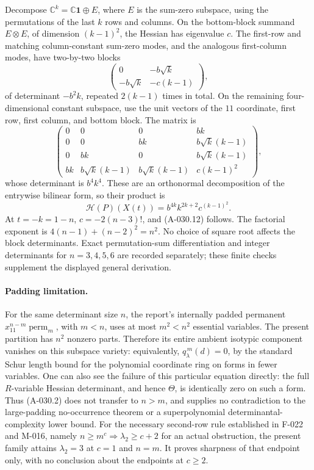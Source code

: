 Decompose \(\mathbb C^k=\mathbb C\mathbf1\oplus E\), where
\(E\) is the sum-zero subspace, using the permutations of the
last \(k\) rows and columns. On the bottom-block summand
\(E\otimes E\), of dimension \((k-1)^2\), the Hessian has
eigenvalue \(c\). The first-row and matching column-constant
sum-zero modes, and the analogous first-column modes, have
two-by-two blocks
\[
 \begin{pmatrix}0&-b\sqrt{k}\\-b\sqrt{k}&-c(k-1)\end{pmatrix},
\]
of determinant \(-b^2k\), repeated \(2(k-1)\) times in total.
On the remaining four-dimensional constant subspace, use the
unit vectors of the \(11\) coordinate, first row, first column,
and bottom block. The matrix is
\[
 \begin{pmatrix}
 0&0&0&bk\\
 0&0&bk&b\sqrt{k}(k-1)\\
 0&bk&0&b\sqrt{k}(k-1)\\
 bk&b\sqrt{k}(k-1)&b\sqrt{k}(k-1)&c(k-1)^2
 \end{pmatrix},
\]
whose determinant is \(b^4k^4\). These are an orthonormal
decomposition of the entrywise bilinear form, so their product is
\[
          \mathcal H(P)(X(t))
               =b^{4k}k^{2k+2}c^{(k-1)^2}.                     \tag{A-030.13}
\]
At \(t=-k=1-n\), \(c=-2(n-3)!\), and (A-030.12) follows.
The factorial exponent is
\(4(n-1)+(n-2)^2=n^2\). No choice of square root affects the
block determinants. Exact permutation-sum differentiation and
integer determinants for \(n=3,4,5,6\) are recorded separately;
these finite checks supplement the displayed general derivation.

\paragraph{Padding limitation.}
For the same determinant size \(n\), the report's internally
padded permanent \(x_{11}^{n-m}\operatorname{perm}_m\),
with \(m<n\), uses at most \(m^2<n^2\) essential variables.
The present partition has
\(n^2\) nonzero parts. Therefore its entire ambient isotypic
component vanishes on this subspace variety: equivalently,
\(q_\lambda^{\,m}(d)=0\), by the standard Schur length bound
for the polynomial coordinate ring on forms in fewer variables.
One can also see the failure of this particular equation directly:
the full \(R\)-variable Hessian determinant, and hence
\(\Theta\), is identically zero on such a form. Thus (A-030.2)
does not transfer to \(n>m\), and supplies no contradiction to
the large-padding no-occurrence theorem or a superpolynomial
determinantal-complexity lower bound.
For the necessary second-row rule established in F-022 and
M-016, namely \(n\geq m^c\Rightarrow\lambda_2\geq c+2\)
for an actual obstruction, the present family attains
\(\lambda_2=3\) at \(c=1\) and \(n=m\). It proves sharpness
of that endpoint only, with no conclusion about the endpoints
at \(c\geq2\).

